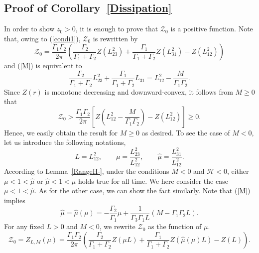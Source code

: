 \documentclass{article}
\theoremstyle{definition}
\begin{document}
\subsection{Proof of Corollary~\ref{Dissipation}}
\label{proof-cor}
In order to show $z_0 > 0$, it is enough to prove that $\mathscr{Z}_0$ is a positive function. Note that, owing to (\ref{condi1}), $\mathscr{Z}_0$ is rewritten by
\begin{equation*}
\mathscr{Z}_0 = \frac{\Gamma_1 \Gamma_2}{2 \pi} \left( \frac{\Gamma_2}{\Gamma_1 + \Gamma_2} Z( L_{23}^2) + \frac{\Gamma_1}{\Gamma_1 + \Gamma_2} Z(L_{31}^2) - Z(L_{12}^2) \right)
\end{equation*}
and (\ref{M}) is equivalent to 
\begin{equation*}
\frac{\Gamma_2}{\Gamma_1 + \Gamma_2} L_{23}^2 + \frac{\Gamma_1}{\Gamma_1 + \Gamma_2} L_{31} = L_{12}^2 - \frac{M}{\Gamma_1 \Gamma_2}.
\end{equation*}
Since $Z(r)$ is monotone decreasing and downward-convex, it follows from $M \geq 0$ that 
\begin{equation*}
\mathscr{Z}_0 > \frac{\Gamma_1 \Gamma_2}{2 \pi} \left[ Z\left( L_{12}^2 - \frac{M}{\Gamma_1 \Gamma_2} \right) - Z(L_{12}^2) \right] \geq 0.
\end{equation*}
Hence, we  easily obtain the result for $M \geq 0$ as desired. To see the case of $M < 0$, let us introduce the following notations,
\begin{equation*}
L = L_{12}^2, \qquad \mu = \frac{L_{23}^2}{L_{12}^2}, \qquad \widehat{\mu} = \frac{L_{31}^2}{L_{12}^2}.
\end{equation*}
According to Lemma~\ref{RangeH-}, under the conditions $M < 0$ and $\mathscr{H} < 0$, either $\mu < 1 < \widehat{\mu}$ or $\widehat{\mu} < 1 < \mu$ holds true for all time.
 We here consider the case $\mu < 1 < \widehat{\mu}$. As for the other case, we can show the fact similarly. Note that  (\ref{M}) implies
\begin{equation*}
\widehat{\mu} = \widehat{\mu}(\mu) = - \frac{\Gamma_2}{\Gamma_1} \mu + \frac{1}{\Gamma_3 \Gamma_1 L} \left( M - \Gamma_1 \Gamma_2 L \right).
\end{equation*}
For any fixed $L > 0$ and $M < 0$, we rewrite $\mathscr{Z}_0$ as the function of $\mu$.
\begin{equation*}
\mathscr{Z}_0 = Z_{L, M}(\mu) = \frac{\Gamma_1 \Gamma_2}{2 \pi} \left( \frac{\Gamma_2}{\Gamma_1 + \Gamma_2} Z( \mu L) + \frac{\Gamma_1}{\Gamma_1 + \Gamma_2} Z( \widehat{\mu}(\mu) L) - Z(L) \right).
\end{equation*}
\end{document}
